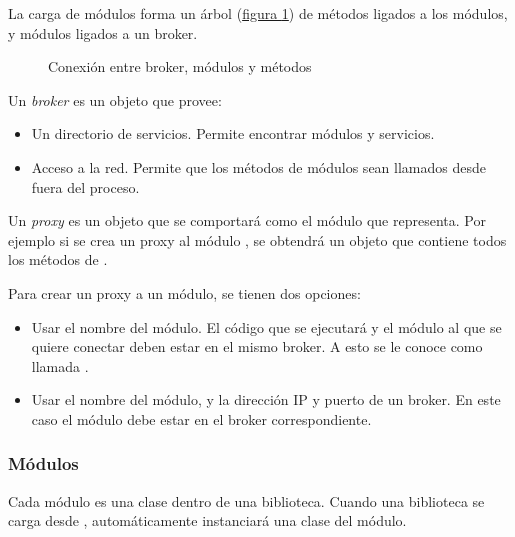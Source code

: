 La carga de módulos forma un árbol (\hyperref[\detokenize{chapter_one/naoqi:broker-mod-meth}]{figura \ref{\detokenize{chapter_one/naoqi:broker-mod-meth}}}) de métodos
ligados a los módulos, y módulos ligados a un broker.

\begin{figure}[htbp]
\centering
\capstart

\noindent{}
\caption{Conexión entre broker, módulos y métodos}\label{\detokenize{chapter_one/naoqi:broker-mod-meth}}\end{figure}


\label{\detokenize{chapter_one/naoqi:broker}}
Un \textit{broker} es un objeto que provee:
\begin{itemize}
\item {} 
Un directorio de servicios. Permite encontrar módulos y servicios.

\item {} 
Acceso a la red. Permite que los métodos de módulos sean llamados desde fuera del proceso.

\end{itemize}

\label{\detokenize{chapter_one/naoqi:proxy}}
Un \textit{proxy} es un objeto que se comportará como el módulo que representa. Por
ejemplo si se crea un proxy al módulo , se obtendrá un objeto
que contiene todos los métodos de .

Para crear un proxy a un módulo, se tienen dos opciones:
\begin{itemize}
\item {} 
Usar el nombre del módulo. El código que se ejecutará y el módulo al que se quiere conectar deben estar en el mismo broker. A esto se le conoce como llamada .

\item {} 
Usar el nombre del módulo, y la dirección IP y puerto de un broker. En este caso el módulo debe estar en el broker correspondiente.

\end{itemize}


\subsubsection{Módulos}
\label{\detokenize{chapter_one/naoqi:modulos}}
Cada módulo es una clase dentro de una biblioteca. Cuando una
biblioteca se carga desde , automáticamente instanciará una clase del módulo.


